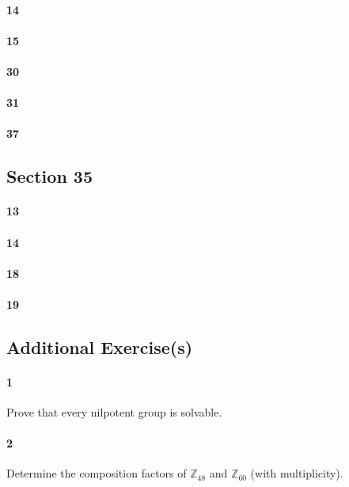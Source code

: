 \documentclass{article}
\newcommand\Z{\mathbb{Z}}
\begin{document}
\paragraph{14}

\paragraph{15}

\paragraph{30}

\paragraph{31}

\paragraph{37}

\subsection*{Section 35}

\paragraph{13}

\paragraph{14}

\paragraph{18}

\paragraph{19}

\subsection*{Additional Exercise(s)}

\paragraph{1} Prove that every nilpotent group is solvable.

\paragraph{2} Determine the composition factors of $\Z_{48}$ and
$\Z_{60}$ (with multiplicity).
\end{document}
